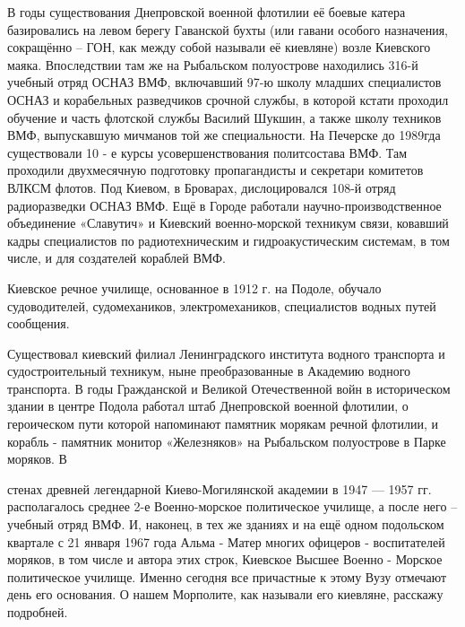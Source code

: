 В годы
существования Днепровской военной флотилии её боевые катера базировались на
левом берегу Гаванской бухты (или гавани особого назначения, сокращённо – ГОН,
как между собой называли её киевляне) возле Киевского маяка. Впоследствии там
же на Рыбальском полуострове находились 316-й учебный отряд ОСНАЗ ВМФ,
включавший 97-ю школу младших специалистов ОСНАЗ и корабельных разведчиков
срочной службы, в которой кстати проходил обучение и часть флотской службы
Василий Шукшин, а также школу техников ВМФ, выпускавшую мичманов той же
специальности. На Печерске до 1989гда существовали 10 - е курсы
усовершенствования политсостава ВМФ. Там проходили двухмесячную подготовку
пропагандисты и секретари комитетов ВЛКСМ флотов. Под Киевом, в Броварах,
дислоцировался 108-й отряд радиоразведки ОСНАЗ ВМФ. Ещё в Городе работали
научно-производственное объединение «Славутич» и Киевский военно-морской
техникум связи, ковавший кадры специалистов по радиотехническим и
гидроакустическим системам, в том числе, и для создателей кораблей ВМФ.

Киевское речное училище, основанное в 1912 г. на Подоле, обучало судоводителей,
судомехаников, электромехаников, специалистов водных путей сообщения.

Существовал киевский филиал Ленинградского института водного транспорта и
судостроительный техникум, ныне преобразованные в Академию водного транспорта.
В годы Гражданской и Великой Отечественной войн в историческом здании в центре
Подола работал штаб Днепровской военной флотилии, о героическом пути которой
напоминают памятник морякам речной флотилии, и корабль - памятник монитор
«Железняков» на Рыбальском полуострове в Парке моряков. В

стенах древней
легендарной Киево-Могилянской академии в 1947 — 1957 гг. располагалось
среднее 2-е Военно-морское политическое училище, а после него – учебный отряд
ВМФ. И, наконец, в тех же зданиях и на ещё одном подольском квартале с 21
января 1967 года Альма - Матер многих офицеров - воспитателей моряков, в том
числе и автора этих строк, Киевское Высшее Военно - Морское политическое
училище. Именно сегодня все причастные к этому Вузу отмечают день его
основания. О нашем Морполите, как называли его киевляне, расскажу подробней.

